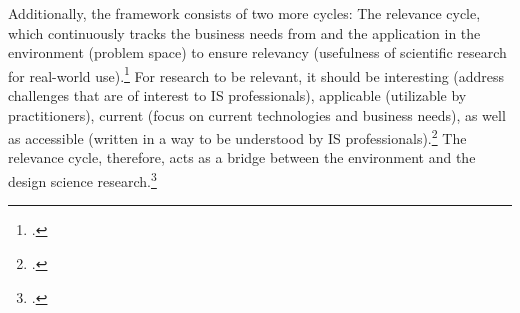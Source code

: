  \label{topic:relevance cycle}
Additionally, the framework consists of two more cycles: The relevance cycle, which continuously tracks the business needs from and the application in the environment (problem space) to ensure relevancy (usefulness of scientific research for real-world use).\footcites[Cf.][p.70]{Simonsciencesartificial1996}[cf.][p.79]{HevnerDesignScienceResearch2004}[cf.][p.129]{ThomasBekannteundweniger2014} For research to be relevant, it should be interesting (address challenges that are of interest to \ac{IS} professionals), applicable (utilizable by practitioners), current (focus on current technologies and business needs), as well as accessible (written in a way to be understood by \ac{IS} professionals).\footcite[Cf.][p.5]{BenbasatEmpiricalresearchinformation1999} The relevance cycle, therefore, acts as a bridge between the environment and the design science research.\footcite[Cf.][p.89]{Hevnerthreecycleview2007} 

